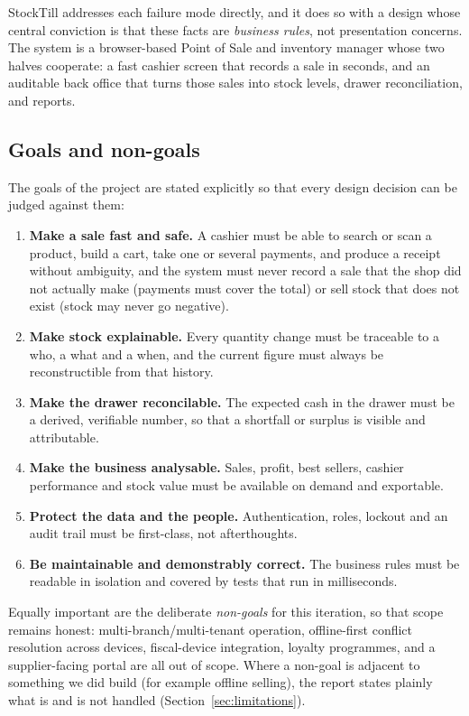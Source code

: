 \documentclass[11pt,a4paper]{article}
\begin{document}
StockTill addresses each failure mode directly, and it does so with a design whose central
conviction is that these facts are \emph{business rules}, not presentation concerns. The system is a
browser-based Point of Sale and inventory manager whose two halves cooperate: a fast cashier screen
that records a sale in seconds, and an auditable back office that turns those sales into stock
levels, drawer reconciliation, and reports.

\subsection{Goals and non-goals}

The goals of the project are stated explicitly so that every design decision can be judged against
them:

\begin{enumerate}[leftmargin=1.4em]
  \item \textbf{Make a sale fast and safe.} A cashier must be able to search or scan a product, build
  a cart, take one or several payments, and produce a receipt without ambiguity, and the system must
  never record a sale that the shop did not actually make (payments must cover the total) or sell
  stock that does not exist (stock may never go negative).
  \item \textbf{Make stock explainable.} Every quantity change must be traceable to a who, a what and
  a when, and the current figure must always be reconstructible from that history.
  \item \textbf{Make the drawer reconcilable.} The expected cash in the drawer must be a derived,
  verifiable number, so that a shortfall or surplus is visible and attributable.
  \item \textbf{Make the business analysable.} Sales, profit, best sellers, cashier performance and
  stock value must be available on demand and exportable.
  \item \textbf{Protect the data and the people.} Authentication, roles, lockout and an audit trail
  must be first-class, not afterthoughts.
  \item \textbf{Be maintainable and demonstrably correct.} The business rules must be readable in
  isolation and covered by tests that run in milliseconds.
\end{enumerate}

Equally important are the deliberate \emph{non-goals} for this iteration, so that scope remains
honest: multi-branch/multi-tenant operation, offline-first conflict resolution across devices,
fiscal-device integration, loyalty programmes, and a supplier-facing portal are all out of scope.
Where a non-goal is adjacent to something we did build (for example offline selling), the report
states plainly what is and is not handled (Section~\ref{sec:limitations}).
\end{document}

